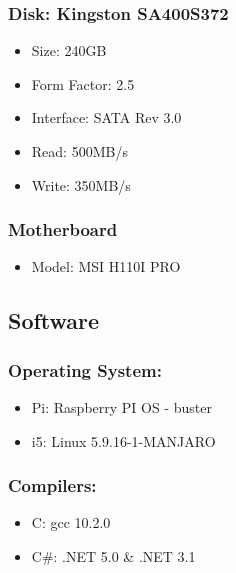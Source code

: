 \documentclass[a4paper, openany]{book}
\begin{document}
\begin{appendix}
\begin{minipage}{0.4\textwidth}
\subsubsection{Disk: Kingston SA400S372}
\begin{itemize}
\itemsep0em
\item Size: 240GB\\
\item Form Factor: 2.5\\
\item Interface: SATA Rev 3.0\\
\item Read: 500MB/s\\
\item Write: 350MB/s\\
\end{itemize}
\subsubsection{Motherboard}
\begin{itemize}
\itemsep0em
\item Model: MSI H110I PRO\\
\end{itemize}
\end{minipage}
\hspace{2cm}
\begin{minipage}{0.4\textwidth}
\subsection{Software}
\subsubsection{Operating System:}
\begin{itemize}
\itemsep0em
\item Pi: Raspberry PI OS - buster\\
\item i5: Linux 5.9.16-1-MANJARO
\end{itemize}
\subsubsection{Compilers:}
\begin{itemize}
\itemsep0em
\item C: gcc 10.2.0\\
\item C#: .NET 5.0 & .NET 3.1\\
\end{itemize}

\end{minipage}
\end{appendix}
\end{document}
